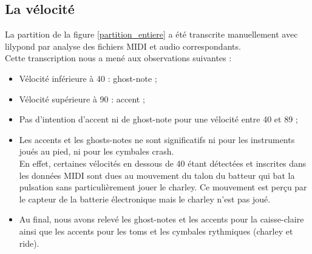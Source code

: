 \subsection*{La vélocité}
\label{velocite}
La partition de la figure \ref{partition_entiere} a été transcrite manuellement avec lilypond par analyse des fichiers MIDI et audio correspondants.\\
Cette transcription nous a mené aux observations suivantes :
\begin{itemize}
	\item Vélocité inférieure à 40 : ghost-note ;
	\item Vélocité supérieure à 90 : accent ;
	\item Pas d’intention d’accent ni de ghost-note pour une vélocité entre 40 et 89 ;
	\item Les accents et les ghosts-notes ne sont significatifs ni pour les instruments joués au pied, ni pour les cymbales crash.\\
	En effet, certaines vélocités en dessous de 40 étant détectées et inscrites dans les données MIDI sont dues au mouvement du talon du batteur qui bat la pulsation sans particulièrement jouer le charley. Ce mouvement est perçu par le capteur de la batterie électronique mais le charley n’est pas joué.
	\item Au final, nous avons relevé les ghost-notes et les accents pour la caisse-claire ainsi que les accents pour les toms et les cymbales rythmiques (charley et ride).
\end{itemize}
